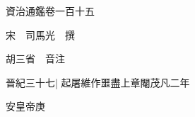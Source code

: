 






























































資治通鑑卷一百十五

宋　司馬光　撰

胡三省　音注

晉紀三十七|{
	起屠維作噩盡上章閹茂凡二年}


安皇帝庚

